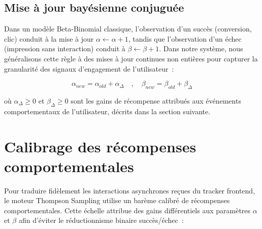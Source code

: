 \subsection{Mise à jour bayésienne conjuguée}

Dans un modèle Beta-Binomial classique, l'observation d'un succès (conversion, clic) conduit à la mise à jour $ \alpha \leftarrow \alpha + 1 $, tandis que l'observation d'un échec (impression sans interaction) conduit à $ \beta \leftarrow \beta + 1 $. Dans notre système, nous généralisons cette règle à des mises à jour continues non entières pour capturer la granularité des signaux d'engagement de l'utilisateur~:

\begin{equation}
    \alpha_{new} = \alpha_{old} + \alpha_{\Delta} \quad , \quad \beta_{new} = \beta_{old} + \beta_{\Delta}
    \label{eq:conjugate_update}
\end{equation}

où $\alpha_{\Delta} \ge 0$ et $\beta_{\Delta} \ge 0$ sont les gains de récompense attribués aux événements comportementaux de l'utilisateur, décrits dans la section suivante.

\section{Calibrage des récompenses comportementales}

Pour traduire fidèlement les interactions asynchrones reçues du tracker frontend, le moteur Thompson Sampling utilise un barème calibré de récompenses comportementales. Cette échelle attribue des gains différentiels aux paramètres $\alpha$ et $\beta$ afin d'éviter le réductionnisme binaire succès/échec~:

